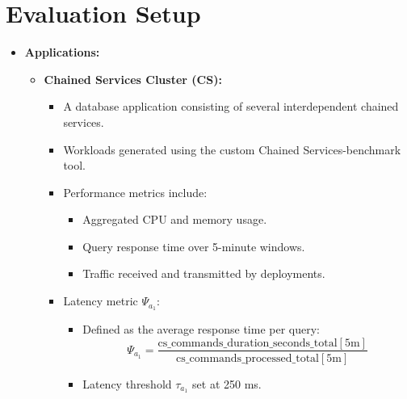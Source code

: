 \documentclass[conference]{IEEEtran}
\begin{document}
\section{Evaluation Setup}
\label{sec:evaluation_setup}
\begin{itemize}
    \item \textbf{Applications:}
    \begin{itemize}
        \item \textbf{Chained Services Cluster (CS):}
        \begin{itemize}
            \item A database application consisting of several interdependent chained services.
            \item Workloads generated using the custom Chained Services-benchmark tool.
            \item Performance metrics include:
            \begin{itemize}
                \item Aggregated CPU and memory usage.
                \item Query response time over 5-minute windows.
                \item Traffic received and transmitted by deployments.
            \end{itemize}
            \item Latency metric $\Psi_{a_1}$:
            \begin{itemize}
                \item Defined as the average response time per query:
                \[
                \Psi_{a_1} = \frac{\text{cs\_commands\_duration\_seconds\_total}[5\text{m}]}{\text{cs\_commands\_processed\_total}[5\text{m}]}
                \]
                \item Latency threshold $\tau_{a_1}$ set at 250 ms.
            \end{itemize}
        \end{itemize}


\end{itemize}
\end{itemize}
\end{document}
